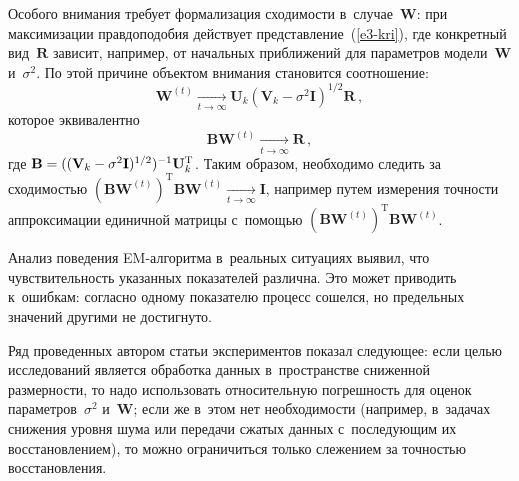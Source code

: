 \begin{multicols}{2}
     Особого внимания требует формализация сходимости 
     в~случае~$\mathbf{W}$: при максимизации правдоподобия действует 
представление~(\ref{e3-kri}), где конкретный вид~$\mathbf{R}$ зависит, 
например, от начальных приближений для параметров модели~$\mathbf{W}$ 
и~$\sigma^2$. По этой причине объектом внимания становится соотношение:
     $$
     \mathbf{W}^{(t)}\underset{t\to\infty}{\longrightarrow} \mathbf{U}_k 
\left(\mathbf{V}_k-\sigma^2\mathbf{I}\right)^{1/2}\mathbf{R}\,,
     $$
которое эквивалентно
$$
\mathbf{B}\mathbf{W}^{(t)} \underset{t\to\infty}{\longrightarrow} \mathbf{R}\,,
$$
где $\mathbf{B}\hm= ((\mathbf{V}_k\hm- \sigma^2\mathbf{I})^{1/2})^{-1} 
\mathbf{U}_k^{\mathrm{T}}$. Таким образом, необходимо следить за 
сходимостью $(\mathbf{BW}^{(t)})^{\mathrm{T}} 
\mathbf{BW}^{(t)}\underset{t\to\infty}{\longrightarrow} \mathbf{I}$, например 
путем измерения точности аппроксимации единичной матрицы с~по\-мощью 
$(\mathbf{BW}^{(t)})^{\mathrm{T}} \mathbf{BW}^{(t)}$.

     Анализ поведения EM-ал\-го\-рит\-ма в~реальных ситуациях выявил, что 
чувствительность указанных показателей различна. Это может приводить 
к~ошибкам: согласно одному показателю процесс сошелся, но предельных 
значений другими не достигнуто. 
     
     Ряд проведенных автором статьи экспериментов показал следующее: 
если целью исследований является обработка данных в~пространстве 
сниженной размерности, то надо использовать относительную погрешность для 
оценок параметров~$\sigma^2$ и~$\mathbf{W}$; если же в~этом нет 
необходимости (например, в~задачах снижения уровня шума или передачи 
сжатых данных с~по\-сле\-ду\-ющим их восстановлением), то мож\-но ограничиться 
только слежением за точ\-ностью восстановления.
     

\end{multicols}
